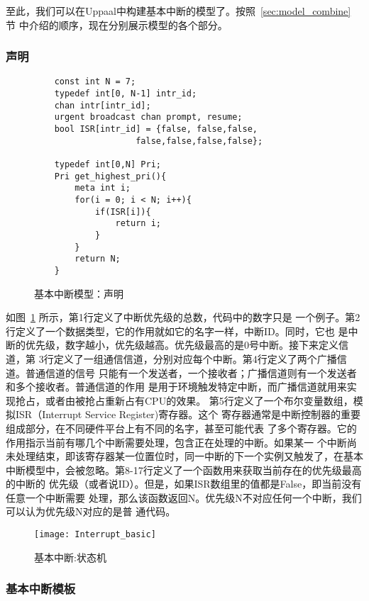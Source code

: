 至此，我们可以在Uppaal中构建基本中断的模型了。按照~\ref{sec:model_combine} 节
中介绍的顺序，现在分别展示模型的各个部分。

\subsubsection{声明}
\label{subsubsec:basic_decl}

\begin{figure}[H]
	\centering
	\begin{lstlisting}
	const int N = 7;
	typedef int[0, N-1] intr_id; 
	chan intr[intr_id];
	urgent broadcast chan prompt, resume;
	bool ISR[intr_id] = {false, false,false,
					false,false,false,false};
	
	typedef int[0,N] Pri;
	Pri get_highest_pri(){
		meta int i;
		for(i = 0; i < N; i++){
			if(ISR[i]){
				return i;
			} 
		}
		return N;
	}
	\end{lstlisting}
	\caption{基本中断模型：声明}
	\label{fig:basic_decl}
\end{figure}

如图~\ref{fig:basic_decl} 所示，第1行定义了中断优先级的总数，代码中的数字只是
一个例子。第2行定义了一个数据类型，它的作用就如它的名字一样，中断ID。同时，它也
是中断的优先级，数字越小，优先级越高。优先级最高的是0号中断。接下来定义信道，第
3行定义了一组通信信道，分别对应每个中断。第4行定义了两个广播信道。普通信道的信号
只能有一个发送者，一个接收者；广播信道则有一个发送者和多个接收者。普通信道的作用
是用于环境触发特定中断，而广播信道就用来实现抢占，或者由被抢占重新占有CPU的效果。
第5行定义了一个布尔变量数组，模拟ISR（Interrupt Service Register)寄存器。这个
寄存器通常是中断控制器的重要组成部分，在不同硬件平台上有不同的名字，甚至可能代表
了多个寄存器。它的作用指示当前有哪几个中断需要处理，包含正在处理的中断。如果某一
个中断尚未处理结束，即该寄存器某一位置位时，同一中断的下一个实例又触发了，在基本
中断模型中，会被忽略。第8-17行定义了一个函数用来获取当前存在的优先级最高的中断的
优先级（或者说ID）。但是，如果ISR数组里的值都是False，即当前没有任意一个中断需要
处理，那么该函数返回N。优先级N不对应任何一个中断，我们可以认为优先级N对应的是普
通代码。

\begin{figure}[H]
	\centering
	\texttt{[image: Interrupt\_basic]}
	\caption{基本中断:状态机}
	\label{fig:interrupt_basic}
\end{figure}

\subsubsection{基本中断模板}
\label{subsubsec:basic_intr}

